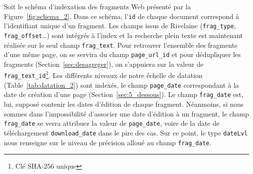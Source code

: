\documentclass[symmetric,justified,marginals=raggedouter]{tufte-book}
\begin{document}
Soit le schéma d'indexation des fragments Web présenté par la Figure~\ref{fig:schema_2}. Dans ce schéma, l'\texttt{id} de chaque document correspond à l'identifiant unique d'un fragment. Les champs issus de Rivelaine (\texttt{frag\_type}, \texttt{frag\_offset}\ldots{}) sont intégrés à l'index et la recherche plein texte est maintenant réalisée sur le seul champ \texttt{frag\_text}. Pour retrouver l'ensemble des fragments d'une même page, on se servira du champ \texttt{page\_url\_id} et pour dédupliquer les fragments (Section~\ref{sec:desagreger}), on s'appuiera sur la valeur de \texttt{frag\_text\_id}\footnote{\RaggedOuter Clé SHA-256 unique}. Les différents niveaux de notre échelle de datation (Table~\ref{tab:datation_2}) sont indexés, le champ \texttt{page\_date} correspondant à la date de création d'une page (Section~\ref{sec:5_dessous}). Le champ \texttt{frag\_date} est, lui, supposé contenir les dates d'édition de chaque fragment. Néanmoins, si nous sommes dans l'impossibilité d'associer une date d'édition à un fragment, le champ \texttt{frag\_date} se verra attribuer la valeur de \texttt{page\_date}, voire de la date de téléchargement \texttt{download\_date} dans le pire des cas. Sur ce point, le type \texttt{dateLvl} nous renseigne sur le niveau de précision alloué au champ \texttt{frag\_date}.
\end{document}
